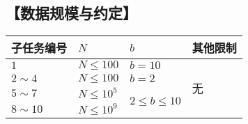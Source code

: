 \documentclass[12pt]{article}
\begin{document}
	\subsection*{\normalsize 【数据规模与约定】}
	\begin{center}
		\begin{tabular}{|p{}<{\centering}|p{}<{\centering}|p{}<{\centering}|p{}<{\centering}|}
		\hline
		子任务编号 & $N$ & $b$ & 其他限制\\
		\hline
		$1$ & $N \le 100$ & $b = 10$ &\multirow{4}{*}{无}\\
		\cline{1-3}
		$2 \sim 4$ & $N \le 100$ & $ b = 2 $ & \\
		\cline{1-3}
		$5 \sim 7$ & $N \le 10^5$ &  \multirow{2}{*}{$2 \le b \le 10$} & \\
		\cline{1-2}
		$8 \sim 10$ & $N \le 10^9$ & &\\
		\hline
		\end{tabular}\\
	\end{center}
	
\end{document}
